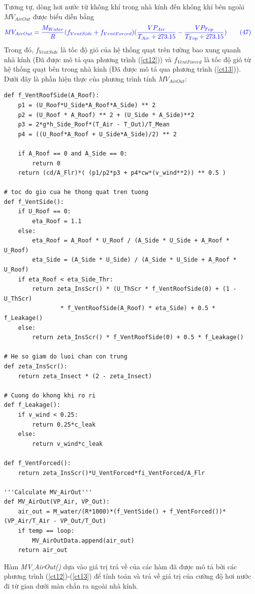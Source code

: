 \documentclass[13pt,a4paper]{article}
\begin{document}
			Tương tự, dòng hơi nước từ không khí trong nhà kính đến không khí bên ngoài $MV_{AirOut}$ được biểu diễn bằng
			\begin{align}
				\color{blue}
					MV_{AirOut} = \frac{M_{Water}}{R}(f_{VentSide} + f_{VentForced})(\dfrac{VP_{Air}}{T_{Air} + 273.15} - \dfrac{VP_{Top}}{T_{Top} + 273.15})
				\color{blue}
				\tag{47}\label{vp21}
			\end{align}
			Trong đó, $f_{VentSide}$ là tốc độ gió của hệ thống quạt trên tường bao xung quanh nhà kính (Đã được mô tả qua phương trình (\ref{ct12})) và $f_{VentForced}$ là tốc độ gió từ hệ thống quạt bên trong nhà kính (Đã được mô tả qua phương trình (\ref{ct13})). \\
			Dưới đây là phần hiện thực của phương trình tính $MV_{AirOut}$:
\begin{lstlisting}
def f_VentRoofSide(A_Roof):
	p1 = (U_Roof*U_Side*A_Roof*A_Side) ** 2
	p2 = (U_Roof * A_Roof) ** 2 + (U_Side * A_Side)**2
	p3 = 2*g*h_Side_Roof*(T_Air - T_Out)/T_Mean
	p4 = ((U_Roof*A_Roof + U_Side*A_Side)/2) ** 2

	if A_Roof == 0 and A_Side == 0: 
		return 0
	return (cd/A_Flr)*( (p1/p2*p3 + p4*cw*(v_wind**2)) ** 0.5 )

# toc do gio cua he thong quat tren tuong
def f_VentSide():
	if U_Roof == 0:
		eta_Roof = 1.1
	else:
		eta_Roof = A_Roof * U_Roof / (A_Side * U_Side + A_Roof * U_Roof)
		eta_Side = (A_Side * U_Side) / (A_Side * U_Side + A_Roof * U_Roof)
	if eta_Roof < eta_Side_Thr:
		return zeta_InsScr() * (U_ThScr * f_VentRoofSide(0) + (1 - U_ThScr)
				* f_VentRoofSide(A_Roof) * eta_Side) + 0.5 * f_Leakage()
	else:
		return zeta_InsScr() * f_VentRoofSide(0) + 0.5 * f_Leakage()

# He so giam do luoi chan con trung
def zeta_InsScr():
	return zeta_Insect * (2 - zeta_Insect)

# Cuong do khong khi ro ri
def f_Leakage():
	if v_wind < 0.25:
		return 0.25*c_leak
	else:
		return v_wind*c_leak

def f_VentForced():
	return zeta_InsScr()*U_VentForced*fi_VentForced/A_Flr

'''Calculate MV_AirOut'''
def MV_AirOut(VP_Air, VP_Out):
	air_out = M_water/(R*1000)*(f_VentSide() + f_VentForced())*(VP_Air/T_Air - VP_Out/T_Out)
	if temp == loop: 
		MV_AirOutData.append(air_out)
	return air_out
\end{lstlisting}	
			Hàm \textit{MV$\_$AirOut()} dựa vào giá trị trả về của các hàm đã được mô tả bởi các phương trình (\ref{ct12})-(\ref{ct13}) để tính toán và trả về giá trị của cường độ hơi nước đi từ gian dưới màn chắn ra ngoài nhà kính. \\ \\
			
\end{document}
